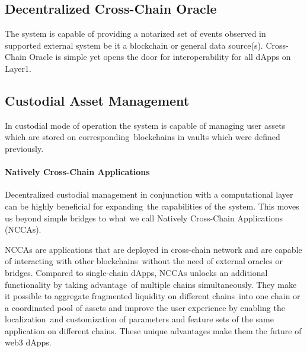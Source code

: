 \subsection{Decentralized Cross-Chain Oracle}\label{subsec:cross-chain-oracle}

The system is capable of providing a notarized set of events observed in supported external system be it a blockchain or general data source(s).
Cross-Chain Oracle is simple yet opens the door for interoperability for all dApps on Layer1.

\subsection{Custodial Asset Management}\label{subsec:custodial-asset-management}

In custodial mode of operation the system is capable of managing user assets which are stored on corresponding\
blockchains in vaults which were defined previously.

\paragraph{Natively Cross-Chain Applications}

Decentralized custodial management in conjunction with a computational layer can be highly beneficial for expanding\
the capabilities of the system.
This moves us beyond simple bridges to what we call Natively Cross-Chain Applications (NCCAs).

NCCAs are applications that are deployed in cross-chain network and are capable of interacting with other blockchains\
without the need of external oracles or bridges.
Compared to single-chain dApps, NCCAs unlocks an additional functionality by taking advantage\
of multiple chains simultaneously.
They make it possible to aggregate fragmented liquidity on different chains\
into one chain or a coordinated pool of assets and improve the user experience by enabling the localization\
and customization of parameters and feature sets of the same application on different chains.
These unique advantages make them the future of web3 dApps.
